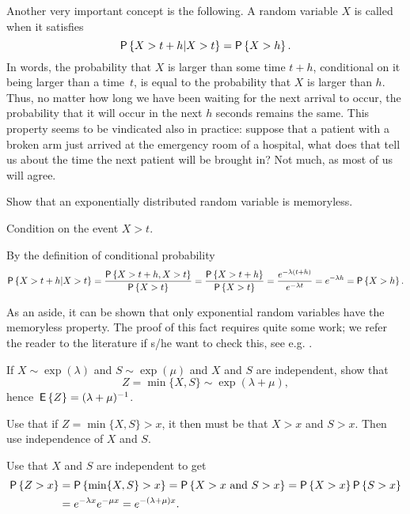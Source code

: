 Another very important concept is the following. A random variable $X$ is called  when it satisfies
\begin{equation*}
  \P{X > t+h | X>t} = \P{X>h}.
\end{equation*}
In words, the probability that $X$ is larger than some time $t+h$,
conditional on it being larger than a time~$t$, is equal to the
probability that $X$ is larger than $h$. Thus, no matter how long we
have been waiting for the next arrival to occur, the probability that
it will occur in the next $h$ seconds remains the same.  This property
seems to be vindicated also in practice: suppose that a patient with a
broken arm just arrived at the emergency room of a hospital, what does
that tell us about the time the next patient will be brought in? Not
much, as most of us will agree.


\begin{exercise}
  Show that an exponentially distributed random variable is
  memoryless.  
  \begin{hint}
Condition on the event ${X>t}$. 
  \end{hint}
  \begin{solution}
By  the definition of conditional probability
\begin{equation*}
  \P{X>t+h|X>t} = \frac{\P{X>t+h, X>t}}{\P{X>t}} = \frac{\P{X>t+h}}{\P{X>t}} = \frac{e^{-\lambda(t+h)}}{e^{-\lambda t}} = e^{-\lambda h} = \P{X>h}.
\end{equation*}

As an aside,  it can be shown that only exponential random variables have the
memoryless property. The proof of this fact requires quite some work;
we refer the reader to the literature if s/he want to check this, see
e.g. \citet[Appendix 3]{yushkevich69:_markov_proces}.
  \end{solution}
\end{exercise}


\begin{exercise}\label{ex:10}
  If $X\sim\exp(\lambda)$ and $S\sim\exp(\mu)$ and $X$ and $S$ are
  independent, show that 
  \begin{equation*}
Z=\min\{X,S\}\sim\exp(\lambda+\mu),
  \end{equation*}
hence $\,\mathsf{E}\left\{Z\right\} = (\lambda+\mu)^{-1}$.
\begin{hint}
Use that if $Z=\min\{X, S\}>x$,  it then must be that $X>x$
  and $S>x$. Then use independence of $X$ and $S$.
\end{hint}
  \begin{solution}
Use that $X$ and $S$ are independent to get
    \begin{equation*}
      \begin{split}
      \P{Z>x} 
&= \P{\min\{X,S\}>x} = \P{X>x\text{ and } S>x} = \P{X>x}\P{S>x} \\
&= e^{-\lambda x} e^{-\mu x} = e^{-(\lambda+\mu)x}.
      \end{split}
    \end{equation*}
  \end{solution}
\end{exercise}


